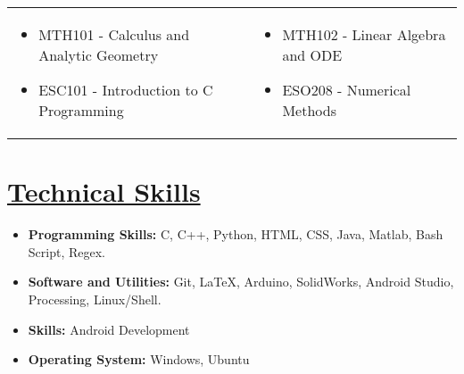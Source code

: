 \documentclass{article}
\begin{document}
\begin{center}
\begin{tabular}{m{7.5cm}  m{7.5cm}}
 \begin{itemize}
\item MTH101 - Calculus and Analytic Geometry
\item ESC101 - Introduction to C Programming
\end{itemize}
&
\begin{itemize}
\item MTH102 - Linear Algebra and ODE
\item ESO208 - Numerical Methods
\end{itemize}
\end{tabular}

\begin{flushright}
\end{flushright}
\end{center}

\section*{\underline{Technical Skills}}
\begin{itemize}
\item \textbf{Programming Skills: } C, C++, Python, HTML, CSS, Java, Matlab, Bash Script, Regex. 
\item \textbf{Software and Utilities: } Git, \LaTeX, Arduino, SolidWorks, Android Studio, Processing, Linux/Shell.
\item \textbf{Skills: } Android Development
\item \textbf{Operating System: } Windows, Ubuntu  
\end{itemize}
\end{document}
